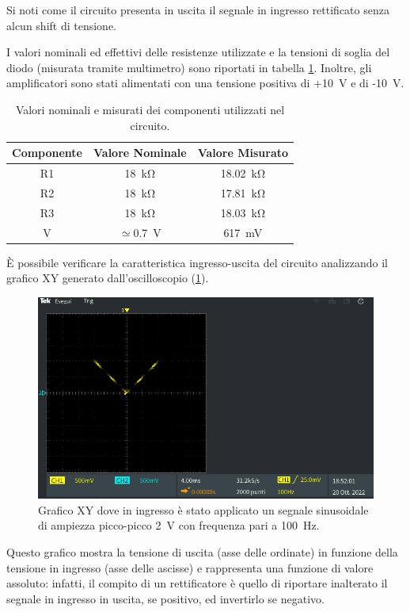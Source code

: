 Si noti come il circuito presenta in uscita il segnale in ingresso rettificato senza alcun shift di tensione. 

\noindent
I valori nominali ed effettivi delle resistenze utilizzate e la tensioni di soglia del diodo (misurata tramite multimetro) sono riportati in tabella \ref{tab:valori_componenti_1}. Inoltre, gli amplificatori sono stati alimentati con una tensione positiva di +\SI{10}{\volt} e di -\SI{10}{\volt}.

\def\arraystretch{1.3}
\begin{table}[h]
	\centering
	\begin{tabular}{|c|c|c|}
		\hline
		Componente	& Valore Nominale & Valore Misurato \\ \hline
		R1 &\SI{18}{\kilo\ohm} & \SI{18,02}{\kilo\ohm} \\ \hline
		R2 &\SI{18}{\kilo\ohm} & \SI{17,81}{\kilo\ohm} \\ \hline
		R3 &\SI{18}{\kilo\ohm} & \SI{18,03}{\kilo\ohm} \\ \hline
		V\sub{D} & $\simeq$\SI{0.7}{\volt} & \SI{617}{\milli\volt} \\ \hline
	\end{tabular}
	\caption{Valori nominali e misurati dei componenti utilizzati nel circuito.}
	\label{tab:valori_componenti_1}
\end{table}

\noindent
\`E possibile verificare la caratteristica ingresso-uscita del circuito analizzando il grafico XY generato dall'oscilloscopio (\Fig\ref{fig:xy_circuito_1}). 
\begin{figure}[tbh]
	\centering
	\includegraphics[width=\linewidth]{./ImageFiles/Laboratorio 3/TEK00000.PNG}
	\caption{Grafico XY dove in ingresso è stato applicato un segnale sinusoidale di ampiezza picco-picco \SI{2}{\volt} con frequenza pari a \SI{100}{\hertz}.}
	\label{fig:xy_circuito_1}
\end{figure}
Questo grafico mostra la tensione di uscita (asse delle ordinate) in funzione della tensione in ingresso (asse delle ascisse) e rappresenta una funzione di valore assoluto: infatti, il compito di un rettificatore è quello di riportare inalterato il segnale in ingresso in uscita, se positivo, ed invertirlo se negativo.

